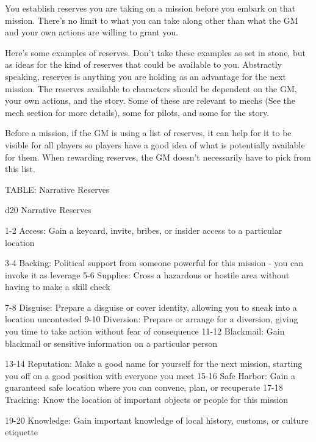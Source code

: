 You establish reserves you are taking on a mission before you embark on that mission. There’s  
no limit to what you can take along other than what the GM and your own actions are willing to  
grant you.
 

Here’s some examples of reserves. Don’t take these examples as set in stone, but as ideas for  
the kind of reserves that could be available to you. Abstractly speaking, reserves is anything  
you are holding as an advantage for the next mission. The reserves available to characters  
should be dependent on the GM, your own actions, and the story. Some of these are relevant to  
mechs (See the mech section for more details), some for pilots, and some for the story.
 

Before a mission, if the GM is using a list of reserves, it can help for it to be visible for all  
players so players have a good idea of what is potentially available for them. When rewarding  
reserves, the GM doesn’t necessarily have to pick from this list.
 

TABLE: Narrative Reserves  

                                                                                                                 


 d20       Narrative	Reserves 

  1-2      Access: Gain a keycard, invite, bribes, or insider access to a particular location 

  3-4      Backing: Political support from someone powerful for this mission - you can invoke it  
           as leverage 
  5-6      Supplies: Cross a hazardous or hostile area without having to make a skill check 

  7-8      Disguise: Prepare a disguise or cover identity, allowing you to sneak into a location  
           uncontested 
 9-10      Diversion: Prepare or arrange for a diversion, giving you time to take action without  
           fear of consequence 
   11-12   Blackmail: Gain blackmail or sensitive information on a particular person 

   13-14   Reputation: Make a good name for yourself for the next mission, starting you off on a  
           good position with everyone you meet 
   15-16   Safe Harbor: Gain a guaranteed safe location where you can convene, plan, or  
           recuperate 
   17-18   Tracking: Know the location of important objects or people for this mission 

   19-20   Knowledge: Gain important knowledge of local history, customs, or culture etiquette  

